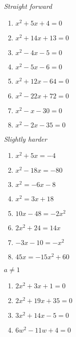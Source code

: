 {\em Straight forward}
\begin{multicols}{2}
	\begin{enumerate}
		\item $x^2+5x+4=0$  
		\item $x^2+14x+13=0$ 
		\item $x^2-4x-5=0$ 
		\item $x^2-5x-6=0$ 
		\item $x^2+12x-64=0$ 
		\item $x^2-22x+72=0$ 
		\item $x^2-x-30=0$ 
		\item $x^2-2x-35=0$ 
	\end{enumerate}
\end{multicols}
{\em Slightly harder}
\begin{multicols}{2}
	\begin{enumerate}
		\item $x^2+5x=-4$  
		\item $x^2-18x=-80$ 
		\item $x^2=-6x-8$ 
		\item $x^2=3x+18$ 
		\item $10x-48 = -2x^2$ 
		\item $2x^2+24 = 14x$ 
		\item $-3x-10 = -x^2$ 
		\item $45x = -15x^2+60$ 
	\end{enumerate}
\end{multicols}

{$a\ne 1$}
\begin{multicols}{2}
	\begin{enumerate}
		\item $2x^2+3x+1=0$ 
		\item $2x^2+19x+35=0$ 
		\item $3x^2+14x-5=0$ 
		\item $6w^2-11w+4=0$ 
	\end{enumerate}
\end{multicols}

